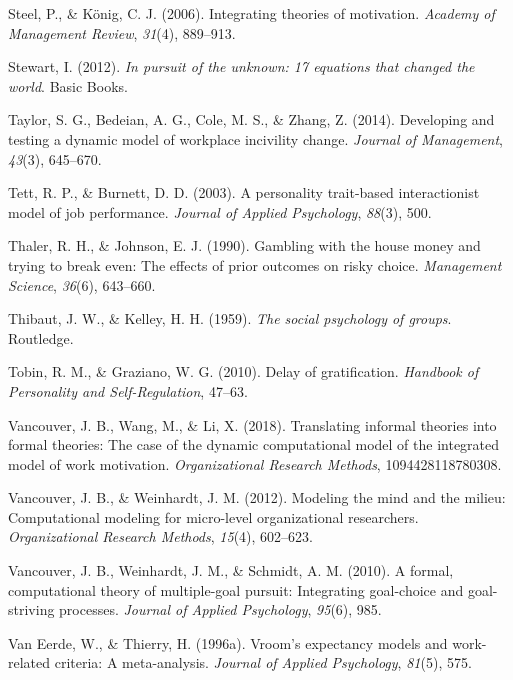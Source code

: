 \documentclass[english,,man]{apa6}
\theoremstyle{definition}
\theoremstyle{definition}
\theoremstyle{definition}
\theoremstyle{remark}
\begin{document}
\leavevmode\hypertarget{ref-steel2006}{}%
Steel, P., \& König, C. J. (2006). Integrating theories of motivation.
\emph{Academy of Management Review}, \emph{31}(4), 889--913.

\leavevmode\hypertarget{ref-stewart2012}{}%
Stewart, I. (2012). \emph{In pursuit of the unknown: 17 equations that
changed the world}. Basic Books.

\leavevmode\hypertarget{ref-taylor2014}{}%
Taylor, S. G., Bedeian, A. G., Cole, M. S., \& Zhang, Z. (2014).
Developing and testing a dynamic model of workplace incivility change.
\emph{Journal of Management}, \emph{43}(3), 645--670.

\leavevmode\hypertarget{ref-tett2003}{}%
Tett, R. P., \& Burnett, D. D. (2003). A personality trait-based
interactionist model of job performance. \emph{Journal of Applied
Psychology}, \emph{88}(3), 500.

\leavevmode\hypertarget{ref-thaler1990}{}%
Thaler, R. H., \& Johnson, E. J. (1990). Gambling with the house money
and trying to break even: The effects of prior outcomes on risky choice.
\emph{Management Science}, \emph{36}(6), 643--660.

\leavevmode\hypertarget{ref-thibaut1959}{}%
Thibaut, J. W., \& Kelley, H. H. (1959). \emph{The social psychology of
groups}. Routledge.

\leavevmode\hypertarget{ref-tobin2010}{}%
Tobin, R. M., \& Graziano, W. G. (2010). Delay of gratification.
\emph{Handbook of Personality and Self-Regulation}, 47--63.

\leavevmode\hypertarget{ref-vancouver2018}{}%
Vancouver, J. B., Wang, M., \& Li, X. (2018). Translating informal
theories into formal theories: The case of the dynamic computational
model of the integrated model of work motivation. \emph{Organizational
Research Methods}, 1094428118780308.

\leavevmode\hypertarget{ref-vancouver2012}{}%
Vancouver, J. B., \& Weinhardt, J. M. (2012). Modeling the mind and the
milieu: Computational modeling for micro-level organizational
researchers. \emph{Organizational Research Methods}, \emph{15}(4),
602--623.

\leavevmode\hypertarget{ref-vancouver2010}{}%
Vancouver, J. B., Weinhardt, J. M., \& Schmidt, A. M. (2010). A formal,
computational theory of multiple-goal pursuit: Integrating goal-choice
and goal-striving processes. \emph{Journal of Applied Psychology},
\emph{95}(6), 985.

\leavevmode\hypertarget{ref-van1996}{}%
Van Eerde, W., \& Thierry, H. (1996a). Vroom's expectancy models and
work-related criteria: A meta-analysis. \emph{Journal of Applied
Psychology}, \emph{81}(5), 575.
\end{document}

